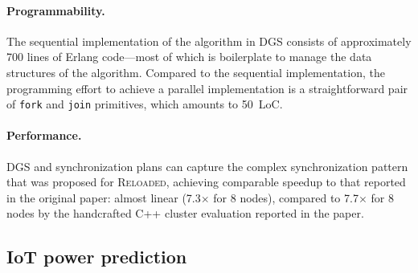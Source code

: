 \paragraph{Programmability.}
The sequential implementation of the algorithm in DGS consists of approximately 700
lines of Erlang code---most of which is boilerplate to manage the
data structures of the algorithm.
Compared to the sequential implementation, the programming effort to achieve a
parallel implementation is a straightforward pair of \texttt{fork} and \texttt{join} primitives, which amounts to 50~LoC.

\paragraph{Performance.}
DGS and synchronization plans can capture the complex synchronization pattern that was proposed for \textsc{Reloaded}, achieving comparable speedup to that reported in the original paper:
almost linear (7.3$\times$ for 8 nodes), compared to 7.7$\times$ for 8 nodes by the handcrafted C++ cluster evaluation reported in the paper.

\subsection{IoT power prediction}
\label{ssec:iot-case-study}

